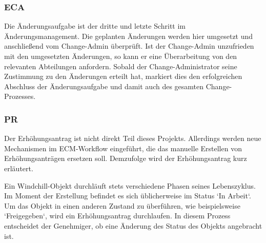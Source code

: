 \subsubsection{\acl{ECA}}
Die Änderungsaufgabe ist der dritte und letzte Schritt im Änderungsmanagement.
Die geplanten Änderungen werden hier umgesetzt und anschließend vom Change-Admin überprüft.
Ist der Change-Admin unzufrieden mit den umgesetzten Änderungen, so kann er eine Überarbeitung von den relevanten Abteilungen anfordern.
Sobald der Change-Administrator seine Zustimmung zu den Änderungen erteilt hat, markiert dies den erfolgreichen Abschluss der Änderungsaufgabe und damit auch des gesamten Change-Prozesses.

\subsubsection{\acl{PR}}
Der Erhöhungsantrag ist nicht direkt Teil dieses Projekts.
Allerdings werden neue Mechanismen im \ac{ECM}-Workflow eingeführt, die das manuelle Erstellen von Erhöhungsanträgen ersetzen soll.
Demzufolge wird der Erhöhungsantrag kurz erläutert.

Ein Windchill-Objekt durchläuft stets verschiedene Phasen seines Lebenszyklus.
Im Moment der Erstellung befindet es sich üblicherweise im Status `In Arbeit`.
Um das Objekt in einen anderen Zustand zu überführen, wie beispielsweise `Freigegeben`, wird ein Erhöhungsantrag durchlaufen.
In diesem Prozess entscheidet der Genehmiger, ob eine Änderung des Status des Objekts angebracht ist.
